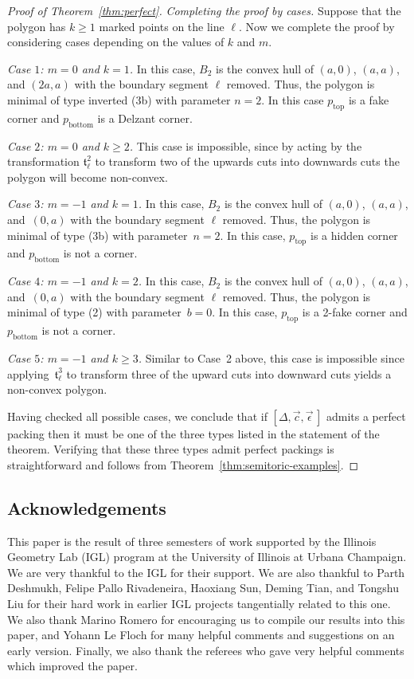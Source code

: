 \documentclass[10pt,a4paper]{amsart}
\numberwithin{equation}{section}
\newcommand{\De}{\Delta}
\newcommand{\stpoly}{[\De,\vec{c},\vec{\epsilon}\,]}
\theoremstyle{definition}
\theoremstyle{plain}
\theoremstyle{plain}
\begin{document}
\begin{proof}[Proof of Theorem~\ref{thm:perfect}]
{\it Completing the proof by cases.}
Suppose that the polygon has $k\geq 1$ marked points on the line $\ell$.
Now we complete the proof by considering cases depending on the values of $k$ and $m$.

{\it Case $1$: $m=0$ and $k=1$.}
In this case, $B_2$ is the convex hull of $(a,0)$, $(a,a)$, and $(2a,a)$ with the boundary segment $\ell$ removed. Thus, the polygon is minimal of type inverted (3b) with parameter $n=2$. In this case $p_{\text{top}}$ is a fake corner and $p_{\text{bottom}}$ is a Delzant corner.

{\it Case $2$: $m=0$ and $k\geq 2$.}
This case is impossible, since by acting by the transformation $\mathfrak{t}_\ell^{2}$ to transform two of the upwards cuts into downwards cuts the polygon will become non-convex.

{\it Case $3$: $m=-1$ and $k=1$.}
In this case, $B_2$ is the convex hull of $(a,0)$, $(a,a)$, and~$(0,a)$ with the boundary segment $\ell$ removed. Thus, the polygon is minimal of type (3b) with parameter~${n=2}$.
In this case, $p_{\text{top}}$ is a hidden corner and $p_{\text{bottom}}$ is not a corner.

{\it Case $4$: $m=-1$ and $k=2$.}
In this case, $B_2$ is the convex hull of $(a,0)$, $(a,a)$, and~$(0,a)$ with the boundary segment $\ell$ removed. Thus, the polygon is minimal of type (2) with parameter~$b=0$.
In this case, $p_{\text{top}}$ is a 2-fake corner and $p_{\text{bottom}}$ is not a corner.

{\it Case $5$: $m=-1$ and $k\geq 3$.}
Similar to Case~2 above, this case is impossible since applying~$\mathfrak{t}_\ell^{3}$ to transform three of the upward cuts into downward cuts yields a non-convex polygon.

Having checked all possible cases, we conclude that if $\stpoly$ admits a perfect packing then it must be one of the three types listed in the statement of the theorem. Verifying that these three types admit perfect packings is straightforward and follows from Theorem~\ref{thm:semitoric-examples}.
\end{proof}

\subsection*{Acknowledgements}

This paper is the result of three semesters of work supported by the Illinois Geometry Lab (IGL) program at the University of Illinois at Urbana Champaign.
We are very thankful to the IGL for their support.
We are also thankful to Parth Deshmukh, Felipe Pallo Rivadeneira, Haoxiang Sun, Deming Tian, and Tongshu Liu
for their hard work in
earlier IGL projects tangentially related to this one.
We also thank Marino Romero for encouraging us to compile our results into this paper, and Yohann Le Floch for many helpful comments and suggestions on an early version.
Finally, we also thank the referees who gave very helpful comments which improved the paper.
\end{document}
